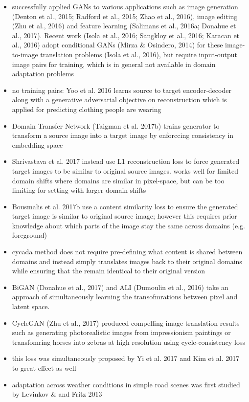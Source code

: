 \begin{itemize}
	\item successfully applied GANs to various applications such as image generation (Denton et al., 2015; Radford et al., 2015; Zhao et al., 2016), image editing (Zhu et al., 2016) and feature learning (Salimans et al., 2016a; Donahue et al., 2017). Recent work (Isola et al., 2016; Sangkloy et al., 2016; Karacan et al., 2016) adopt conditional GANs (Mirza \& Osindero, 2014) for these image-to-image translation problems (Isola et al., 2016), but require input-output image pairs for training, which is in general not available in domain adaptation problems
	\item no training pairs: Yoo et al. 2016 learns source to target encoder-decoder along with a generative adversarial objective on reconstruction which is applied for predicting clothing people are wearing
	\item Domain Transfer Network (Taigman et al. 2017b) trains generator to transform a source image into a target image by enforccing consistency in embedding space
	\item Shrivastava et al. 2017 instead use L1 reconstruction loss to force generated target images to be similar to original source images. works well for limited domain shifts where domains are similar in pixel-space, but can be too limiting for setting with larger domain shifts
	\item Bousmalis et al. 2017b use a content similarity loss to ensure the generated target image is similar to original source image; however this requires prior knowledge about which parts of the image stay the same across domains (e.g. foreground)
	\item cycada method does not require pre-defining what content is shared between domains and instead simply translates images back to their original domains while ensuring that the remain identical to their original version
	\item BiGAN (Donahue et al., 2017) and ALI (Dumoulin et al., 2016) take an approach of simultaneously learning the transofmrations between pixel and latent space.
	\item CycleGAN (Zhu et al., 2017) produced compelling image translation results such as generating photorealistic images from impressionism paintings or transfomring horses into zebras at high resolution using cycle-consistency loss
	\item this loss was simultaneously proposed by Yi et al. 2017 and Kim et al. 2017 to great effect as well
	\item adaptation across weather conditions in simple road scenes was first studied by Levinkov \& and Fritz 2013

\end{itemize}
